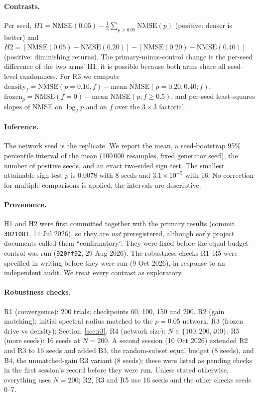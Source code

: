 \documentclass[11pt]{article}
\begin{document}
\paragraph{Contrasts.} Per seed,
$H1=\text{NMSE}(0.05)-\tfrac13\sum_{p>0.05}\text{NMSE}(p)$ (positive: denser
is better) and
$H2=[\text{NMSE}(0.05)-\text{NMSE}(0.20)]-[\text{NMSE}(0.20)-\text{NMSE}(0.40)]$
(positive: diminishing returns). The primary-minus-control change is the
per-seed difference of the two arms' H1; it is possible because both arms
share all seed-level randomness. For R3 we compute
$\text{density}_f=\text{NMSE}(p{=}0.10,f)-\text{mean NMSE}(p{=}0.20,0.40;f)$,
$\text{frozen}_p=\text{NMSE}(f{=}0)-\text{mean NMSE}(p;f\ge0.5)$, and per-seed
least-squares slopes of NMSE on $\log_2 p$ and on $f$ over the $3\times3$
factorial.

\paragraph{Inference.} The network seed is the replicate. We report the mean,
a seed-bootstrap 95\% percentile interval of the mean (100\,000 resamples,
fixed generator seed), the number of positive seeds, and an exact two-sided
sign test. The smallest attainable sign-test $p$ is 0.0078 with 8 seeds and
$3.1\times10^{-5}$ with 16. No correction for multiple comparisons is
applied; the intervals are descriptive.

\paragraph{Provenance.} H1 and H2 were first committed together with the
primary results (commit \texttt{3021081}, 14 Jul 2026), so they are
\emph{not} preregistered, although early project documents called them
``confirmatory''. They were fixed before the equal-budget control was run
(\texttt{920ff92}, 29 Aug 2026). The robustness checks R1--R5 were specified
in writing before they were run (9 Oct 2026), in response to an independent
audit. We treat every contrast as exploratory.

\paragraph{Robustness checks.}
R1 (convergence): 200 trials; checkpoints 60, 100, 150 and 200.
R2 (gain matching): initial spectral radius matched to the $p=0.05$ network.
R3 (frozen drive vs density): Section~\ref{sec:r3}.
R4 (network size): $N\in\{100,200,400\}$.
R5 (more seeds): 16 seeds at $N=200$.
A second session (10 Oct 2026) extended R2 and R3 to 16 seeds and added B3,
the random-subset equal budget (8 seeds), and B4, the unmatched-gain R3
variant (8 seeds); these were listed as pending checks in the first session's
record before they were run. Unless stated otherwise, everything uses
$N=200$; R2, R3 and R5 use 16 seeds and the other checks seeds 0--7.
\end{document}
